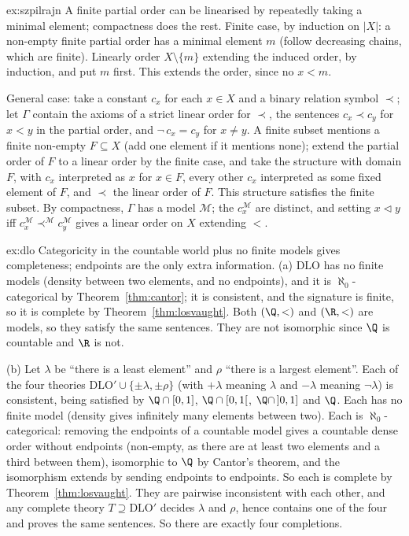 \begin{solution}{ex:szpilrajn}
\idea A finite partial order can be linearised by repeatedly taking a minimal element; compactness does the rest.
\writeup Finite case, by induction on $|X|$: a non-empty finite partial order has a minimal element $m$ (follow decreasing chains, which are finite). Linearly order $X\setminus\{m\}$ extending the induced order, by induction, and put $m$ first. This extends the order, since no $x<m$.

General case: take a constant $c_x$ for each $x\in X$ and a binary relation symbol $\prec$; let $\Gamma$ contain the axioms of a strict linear order for $\prec$, the sentences $c_x\prec c_y$ for $x<y$ in the partial order, and $\neg\,c_x=c_y$ for $x\ne y$. A finite subset mentions a finite non-empty $F\subseteq X$ (add one element if it mentions none); extend the partial order of $F$ to a linear order by the finite case, and take the structure with domain $F$, with $c_x$ interpreted as $x$ for $x\in F$, every other $c_x$ interpreted as some fixed element of $F$, and $\prec$ the linear order of $F$. This structure satisfies the finite subset. By compactness, $\Gamma$ has a model $\mathcal M$; the $c_x^{\mathcal M}$ are distinct, and setting $x\lhd y$ iff $c_x^{\mathcal M}\prec^{\mathcal M}c_y^{\mathcal M}$ gives a linear order on $X$ extending $<$.
\end{solution}

\begin{solution}{ex:dlo}
\idea Categoricity in the countable world plus no finite models gives completeness; endpoints are the only extra information.
\writeup (a) $\mathrm{DLO}$ has no finite models (density between two elements, and no endpoints), and it is $\aleph_0$-categorical by Theorem~\ref{thm:cantor}; it is consistent, and the signature is finite, so it is complete by Theorem~\ref{thm:losvaught}. Both $(\Q,<)$ and $(\R,<)$ are models, so they satisfy the same sentences. They are not isomorphic since $\Q$ is countable and $\R$ is not.

(b) Let $\lambda$ be ``there is a least element'' and $\rho$ ``there is a largest element''. Each of the four theories $\mathrm{DLO}'\cup\{\pm\lambda,\pm\rho\}$ (with $+\lambda$ meaning $\lambda$ and $-\lambda$ meaning $\neg\lambda$) is consistent, being satisfied by $\Q\cap[0,1]$, $\Q\cap[0,1[$, $\Q\cap\,]0,1]$ and $\Q$. Each has no finite model (density gives infinitely many elements between two). Each is $\aleph_0$-categorical: removing the endpoints of a countable model gives a countable dense order without endpoints (non-empty, as there are at least two elements and a third between them), isomorphic to $\Q$ by Cantor's theorem, and the isomorphism extends by sending endpoints to endpoints. So each is complete by Theorem~\ref{thm:losvaught}. They are pairwise inconsistent with each other, and any complete theory $T\supseteq\mathrm{DLO}'$ decides $\lambda$ and $\rho$, hence contains one of the four and proves the same sentences. So there are exactly four completions.
\end{solution}

